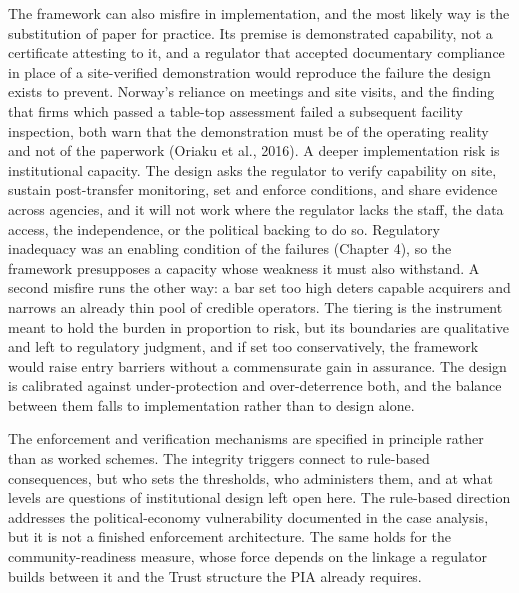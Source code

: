 The framework can also misfire in implementation, and the most likely
way is the substitution of paper for practice. Its premise is
demonstrated capability, not a certificate attesting to it, and a
regulator that accepted documentary compliance in place of a
site-verified demonstration would reproduce the failure the design
exists to prevent. Norway's reliance on meetings and site visits, and
the finding that firms which passed a table-top assessment failed a
subsequent facility inspection, both warn that the demonstration must be
of the operating reality and not of the paperwork (Oriaku et al., 2016).
A deeper implementation risk is institutional capacity. The design asks
the regulator to verify capability on site, sustain post-transfer
monitoring, set and enforce conditions, and share evidence across
agencies, and it will not work where the regulator lacks the staff, the
data access, the independence, or the political backing to do so.
Regulatory inadequacy was an enabling condition of the failures (Chapter
4), so the framework presupposes a capacity whose weakness it must also
withstand. A second misfire runs the other way: a bar set too high
deters capable acquirers and narrows an already thin pool of credible
operators. The tiering is the instrument meant to hold the burden in
proportion to risk, but its boundaries are qualitative and left to
regulatory judgment, and if set too conservatively, the framework would
raise entry barriers without a commensurate gain in assurance. The
design is calibrated against under-protection and over-deterrence both,
and the balance between them falls to implementation rather than to
design alone.

The enforcement and verification mechanisms are specified in principle
rather than as worked schemes. The integrity triggers connect to
rule-based consequences, but who sets the thresholds, who administers
them, and at what levels are questions of institutional design left open
here. The rule-based direction addresses the political-economy
vulnerability documented in the case analysis, but it is not a finished
enforcement architecture. The same holds for the community-readiness
measure, whose force depends on the linkage a regulator builds between
it and the Trust structure the PIA already requires.

